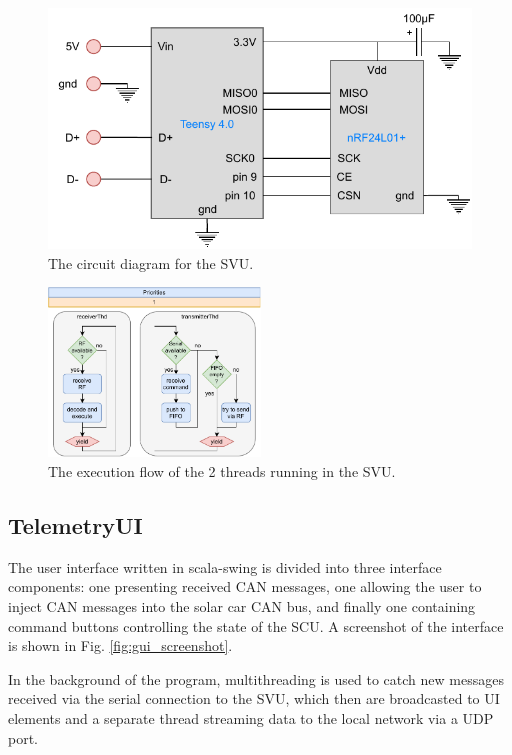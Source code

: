 \documentclass[a4paper,conference]{IEEEtran}
\begin{document}
\begin{figure}
    \centering
    \includegraphics[width=\linewidth]{documentation/images/SVU_CircuitDiagram.pdf}
    \caption{The circuit diagram for the SVU.}
    \label{fig:SVU_circuit}
\end{figure}
\begin{figure}
    \centering
    \includegraphics[height=4.5cm]{documentation/images/SVU_threads.pdf}
    \caption{The execution flow of the 2 threads running in the SVU.}
    \label{fig:SVU_threads}
\end{figure}
\subsection{TelemetryUI}

The user interface written in scala-swing is divided into three interface components: one presenting received CAN messages, one allowing the user to inject CAN messages into the solar car CAN bus, and finally one containing command buttons controlling the state of the SCU. A screenshot of the interface is shown in Fig. \ref{fig:gui_screenshot}.

In the background of the program, multithreading is used to catch new messages received via the serial connection to the SVU, which then are broadcasted to UI elements and a separate thread streaming data to the local network via a UDP port. 
\end{document}
